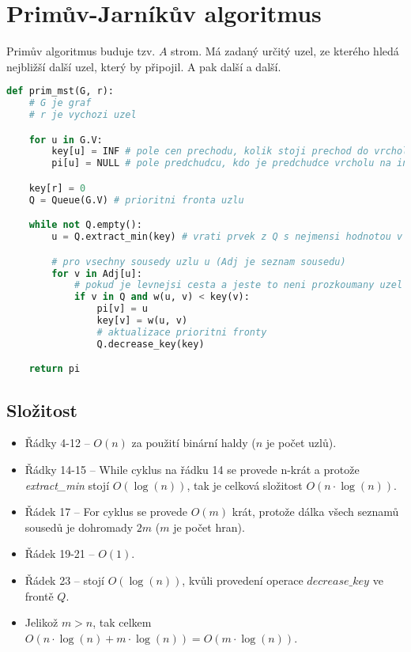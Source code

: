
\section{Primův-Jarníkův algoritmus}

Primův algoritmus buduje tzv. $A$ strom. Má zadaný určitý uzel, ze kterého hledá nejbližší další uzel, který by připojil. A pak další a další.

\bigskip\noindent\begin{minipage}{\linewidth}
\begin{lstlisting}[language=Python, caption={Primův algoritmus.}]
def prim_mst(G, r):
    # G je graf
    # r je vychozi uzel

    for u in G.V:
        key[u] = INF # pole cen prechodu, kolik stoji prechod do vrcholu na indexu
        pi[u] = NULL # pole predchudcu, kdo je predchudce vrcholu na indexu

    key[r] = 0
    Q = Queue(G.V) # prioritni fronta uzlu

    while not Q.empty():
        u = Q.extract_min(key) # vrati prvek z Q s nejmensi hodnotou v key

        # pro vsechny sousedy uzlu u (Adj je seznam sousedu)
        for v in Adj[u]:
            # pokud je levnejsi cesta a jeste to neni prozkoumany uzel
            if v in Q and w(u, v) < key(v):
                pi[v] = u
                key[v] = w(u, v)
                # aktualizace prioritni fronty
                Q.decrease_key(key)

    return pi
\end{lstlisting}
\end{minipage}

\subsection{Složitost}

\begin{itemize}
    \item Řádky 4-12 -- $O(n)$ za použití binární haldy ($n$ je počet uzlů).
    \item Řádky 14-15 -- While cyklus na řádku 14 se provede n-krát a protože \textit{extract\_min} stojí $O(\log(n))$, tak je celková složitost $O(n \cdot \log(n))$.
    \item Řádek 17 -- For cyklus se provede $O(m)$ krát, protože dálka všech seznamů sousedů je dohromady $2m$ ($m$ je počet hran).
    \item Řádek 19-21 -- $O(1)$.
    \item Řádek 23 -- stojí $O(\log(n))$, kvůli provedení operace $decrease\_key$ ve frontě $Q$.
    \item Jelikož $m > n$, tak celkem $O(n \cdot \log(n) + m \cdot \log(n)) = O(m \cdot \log(n))$.
\end{itemize}

